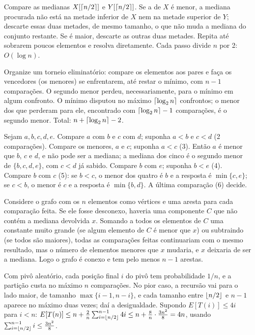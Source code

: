  Compare as medianas $X[\lceil n/2\rceil]$ e $Y[\lceil n/2\rceil]$. Se a de $X$ é menor, a mediana procurada não está na metade inferior de $X$ nem na metade superior de $Y$; descarte essas duas metades, de mesmo tamanho, o que não muda a mediana do conjunto restante. Se é maior, descarte as outras duas metades. Repita até sobrarem poucos elementos e resolva diretamente. Cada passo divide $n$ por 2: $O(\log n)$.

 Organize um torneio eliminatório: compare os elementos aos pares e faça os vencedores (os menores) se enfrentarem, até restar o mínimo, com $n-1$ comparações. O segundo menor perdeu, necessariamente, para o mínimo em algum confronto. O mínimo disputou no máximo $\lceil\log_2n\rceil$ confrontos; o menor dos que perderam para ele, encontrado com $\lceil\log_2n\rceil-1$ comparações, é o segundo menor. Total: $n+\lceil\log_2n\rceil-2$.

 Sejam $a,b,c,d,e$. Compare $a$ com $b$ e $c$ com $d$; suponha $a<b$ e $c<d$ (2 comparações). Compare os menores, $a$ e $c$; suponha $a<c$ (3). Então $a$ é menor que $b$, $c$ e $d$, e não pode ser a mediana; a mediana dos cinco é o segundo menor de $\{b,c,d,e\}$, com $c<d$ já sabido. Compare $b$ com $e$; suponha $b<e$ (4). Compare $b$ com $c$ (5): se $b<c$, o menor dos quatro é $b$ e a resposta é $\min\{c,e\}$; se $c<b$, o menor é $c$ e a resposta é $\min\{b,d\}$. A última comparação (6) decide.

 Considere o grafo com os $n$ elementos como vértices e uma aresta para cada comparação feita. Se ele fosse desconexo, haveria uma componente $C$ que não contém a mediana devolvida $x$. Somando a todos os elementos de $C$ uma constante muito grande (se algum elemento de $C$ é menor que $x$) ou subtraindo (se todos são maiores), todas as comparações feitas continuariam com o mesmo resultado, mas o número de elementos menores que $x$ mudaria, e $x$ deixaria de ser a mediana. Logo o grafo é conexo e tem pelo menos $n-1$ arestas.

 Com pivô aleatório, cada posição final $i$ do pivô tem probabilidade $1/n$, e a partição custa no máximo $n$ comparações. No pior caso, a recursão vai para o lado maior, de tamanho $\max\{i-1,n-i\}$, e cada tamanho entre $\lfloor n/2\rfloor$ e $n-1$ aparece no máximo duas vezes; daí a desigualdade. Supondo $E[T(i)]\le4i$ para $i<n$: $E[T(n)]\le n+\frac2n\sum_{i=\lfloor n/2\rfloor}^{n-1}4i\le n+\frac8n\cdot\frac{3n^2}8=4n$, usando $\sum_{i=\lfloor n/2\rfloor}^{n-1}i\le\frac{3n^2}8$.

